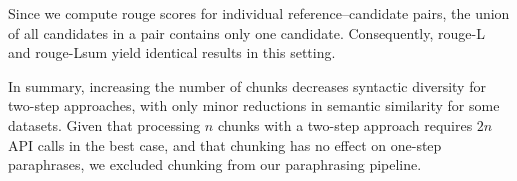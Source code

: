 Since we compute \ac{rouge} scores for individual reference–candidate pairs, the union of all candidates in a pair contains only one candidate. 
Consequently, \ac{rouge}-L and \ac{rouge}-Lsum yield identical results in this setting.

In summary, increasing the number of chunks decreases syntactic diversity for two-step approaches, with only minor reductions in semantic similarity for some datasets. 
Given that processing $n$ chunks with a two-step approach requires $2n$ API calls in the best case, and that chunking has no effect on one-step paraphrases, we excluded chunking from our paraphrasing pipeline.
